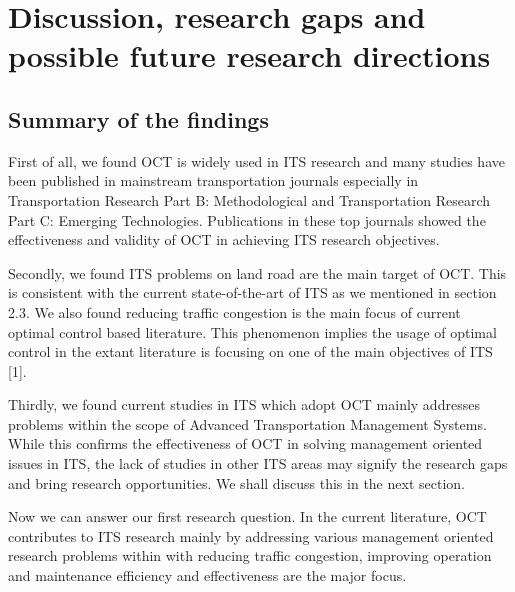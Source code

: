 \documentclass[12pt,onecolumn,twoside]{JCTA}
\theoremstyle{mystyle}
\begin{document}
\section{Discussion, research gaps and possible future research directions}
\subsection{Summary of the findings}
First of all, we found OCT is widely used in ITS research and many studies have been published in mainstream transportation journals especially in Transportation Research Part B: Methodological and Transportation Research Part C: Emerging Technologies. Publications in these top journals showed the effectiveness and validity of OCT in achieving ITS research objectives.

Secondly, we found ITS problems on land road are the main target of OCT. This is consistent with the current state-of-the-art of ITS as we mentioned in section 2.3. We also found reducing traffic congestion is the main focus of current optimal control based literature. This phenomenon implies the usage of optimal control in the extant literature is focusing on one of the main objectives of ITS [1].

Thirdly, we found current studies in ITS which adopt OCT mainly addresses problems within the scope of Advanced Transportation Management Systems. While this confirms the effectiveness of OCT in solving management oriented issues in ITS, the lack of studies in other ITS areas may signify the research gaps and bring research opportunities. We shall discuss this in the next section.

Now we can answer our first research question. In the current literature, OCT contributes to ITS research mainly by addressing various management oriented research problems within with reducing traffic congestion, improving operation and maintenance efficiency and effectiveness are the major focus.
\end{document}
